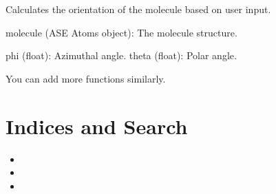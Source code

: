 \documentclass[letterpaper,10pt,english]{sphinxmanual}
\begin{document}
\begin{fulllineitems}
\label{\detokenize{module_documentation:id1}}
\pysigstartsignatures
{}
\pysigstopsignatures
\sphinxAtStartPar
Calculates the orientation of the molecule based on user input.
\begin{description}
\sphinxAtStartPar
molecule (ASE Atoms object): The molecule structure.

\sphinxAtStartPar
phi (float): Azimuthal angle.
theta (float): Polar angle.

\end{description}

\end{fulllineitems}


\sphinxAtStartPar
You can add more functions similarly.


\chapter{Indices and Search}
\label{\detokenize{index:indices-and-search}}\begin{itemize}
\item {} 
\sphinxAtStartPar
{}

\item {} 
\sphinxAtStartPar
{}

\item {} 
\sphinxAtStartPar
{}

\end{itemize}


\renewcommand{\indexname}{Python Module Index}
\begin{sphinxtheindex}
\let\bigletter\sphinxstyleindexlettergroup
\bigletter{a}
\item\relax{}
\end{sphinxtheindex}

\renewcommand{\indexname}{Index}
\printindex
\end{document}
